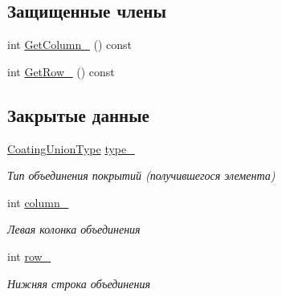 \subsection*{Защищенные члены}
\begin{DoxyCompactItemize}
\item 
int \hyperlink{classrtm_1_1_coating_union_a1d2b6a339f6cafbe41d416f371cbed04}{Get\+Column\+\_\+} () const
\item 
int \hyperlink{classrtm_1_1_coating_union_ad283fd24e0c3347c569e3ea5772a9651}{Get\+Row\+\_\+} () const
\end{DoxyCompactItemize}
\subsection*{Закрытые данные}
\begin{DoxyCompactItemize}
\item 
\mbox{\label{classrtm_1_1_coating_union_ab8fd79074da6b4915bbbaec93befc0f0}} 
\hyperlink{namespacertm_a6a0d424be5696f64038e5e84a79cabfa}{Coating\+Union\+Type} \hyperlink{classrtm_1_1_coating_union_ab8fd79074da6b4915bbbaec93befc0f0}{type\+\_\+}
\begin{DoxyCompactList}\small\item\em Тип объединения покрытий (получившегося элемента) \end{DoxyCompactList}\item 
\mbox{\label{classrtm_1_1_coating_union_aef5f5d3f4ac06044fe4482bf60b01e77}} 
int \hyperlink{classrtm_1_1_coating_union_aef5f5d3f4ac06044fe4482bf60b01e77}{column\+\_\+}
\begin{DoxyCompactList}\small\item\em Левая колонка объединения \end{DoxyCompactList}\item 
\mbox{\label{classrtm_1_1_coating_union_aa7133c7a2059495ab4c02b1813e8abfb}} 
int \hyperlink{classrtm_1_1_coating_union_aa7133c7a2059495ab4c02b1813e8abfb}{row\+\_\+}
\begin{DoxyCompactList}\small\item\em Нижняя строка объединения \end{DoxyCompactList}\item 
\mbox{\label{classrtm_1_1_coating_union_acab8ed30a66c786a3ac7d0edff914dbc}} 

\end{DoxyCompactItemize}
